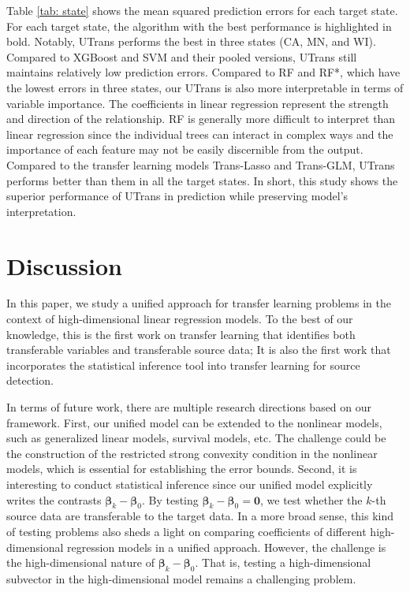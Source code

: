 \documentclass[twoside,12pt]{article}
\newcommand{\mb}[1]{\boldsymbol{\mathbf{#1}}}
\begin{document}
Table \ref{tab: state} shows the mean squared prediction errors for each target state.
For each target state, the algorithm with the best performance is highlighted in bold.
Notably, UTrans performs the best in three states (CA, MN, and WI).
Compared to XGBoost and SVM and their pooled versions, UTrans still maintains relatively low prediction errors.
Compared to RF and RF*, which have the lowest errors in three states, our UTrans is also more interpretable in terms of variable importance.
The coefficients in linear regression represent the strength and direction of the relationship. RF is generally more difficult to interpret than linear regression since the individual trees can interact in complex ways and the importance of each feature may not be easily discernible from the output.
Compared to the transfer learning models Trans-Lasso and Trans-GLM, UTrans performs better than them in all the target states.
In short, this study shows the superior performance of UTrans in prediction while preserving model's interpretation.
	
\section{Discussion}
\label{sec: dis}
In this paper, we study a unified approach for transfer learning problems in the context of high-dimensional linear regression models.
To the best of our knowledge, this is the first work on transfer learning that identifies both transferable variables and transferable source data;
It is also the first work that incorporates the statistical inference tool into transfer learning for source detection.

In terms of future work, there are multiple research directions based on our framework.
First, our unified model can be extended to the nonlinear models, such as generalized linear models, survival models, etc.
The challenge could be the construction of the restricted strong convexity condition in the nonlinear models, which is essential for establishing the error bounds.
Second, it is interesting to conduct statistical inference since our unified model explicitly writes the contrasts $\mb\beta_k-\mb\beta_0$.
By testing $\mb\beta_k-\mb\beta_0=\mb 0$, we test whether the $k$-th source data are transferable to the target data.
In a more broad sense, this kind of testing problems also sheds a light on comparing coefficients of different high-dimensional regression models in a unified approach.
However, the challenge is the high-dimensional nature of $\mb\beta_k-\mb\beta_0$.
That is, testing a high-dimensional subvector in the high-dimensional model remains a challenging problem.
\end{document}
